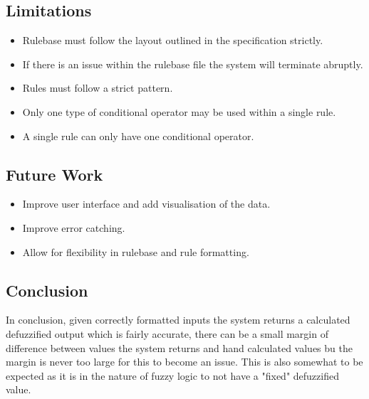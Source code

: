 \documentclass{article}
\begin{document}
\subsection{Limitations}
\begin{itemize}
  \item Rulebase must follow the layout outlined in the specification strictly.
  \item If there is an issue within the rulebase file the system will terminate abruptly.
  \item Rules must follow a strict pattern.
  \item Only one type of conditional operator may be used within a single rule.
  \item A single rule can only have one conditional operator.
\end{itemize}
\subsection{Future Work}
\begin{itemize}
  \item Improve user interface and add visualisation of the data.
  \item Improve error catching.
  \item Allow for flexibility in rulebase and rule formatting.
\end{itemize}

\subsection{Conclusion}
In conclusion, given correctly formatted inputs the system returns a calculated defuzzified output which is fairly accurate, there can be a small margin of difference between values the system returns and hand calculated values bu the margin is never too large for this to become an issue. This is also somewhat to be expected as it is in the nature of fuzzy logic to not have a "fixed" defuzzified value.
\end{document}
